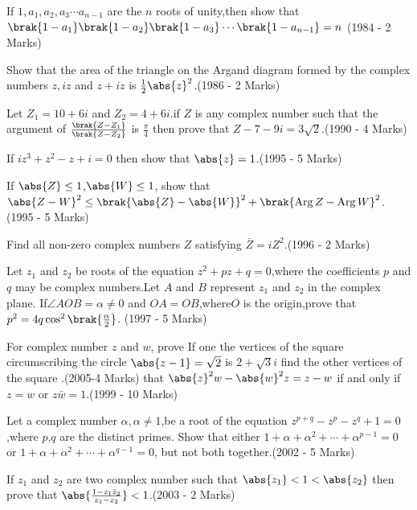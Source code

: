 \iffalse
    \title{Assignment}
    \author{Shreyansh Sonkar - ai24btech11032}
    \section{subjective}
\fi                                     
    \item If $1,a_{1},a_{2},a_{3}\cdots a_{n-1}$ are the $n$ roots of unity,then show that $\brak{1-a_1}\brak{1-a_2}\brak{1-a_3}\cdots \brak{1-a_{n-1}} = n$ \hfill (1984 - 2 Marks)
    \item Show that the area of the triangle on the Argand diagram formed by the complex numbers $z,iz$ and $z+iz$ is $\frac{1}{2}\abs{z}^{2}$.\hfill (1986 - 2 Marks)
    \item Let $Z_{1}=10+6i$ and $Z_{2}=4+6i$.if $Z$ is any complex number such that the argument of $\frac{\brak{Z-Z_1}}{\brak{Z-Z_2}}$ is $\frac{\pi}{4}$ then prove that $Z-7-9i = 3\sqrt{2}$.\hfill(1990 - 4 Marks)
    \item If $iz^{3}+z^{2}-z+i=0$ then show that $\abs{z}=1$.\hfill(1995 - 5 Marks)
    \item If $\abs{Z}\le1$,$\abs{W}\le1$, show that $\abs{Z-W}^{2}\le \brak{\abs{Z}-\abs{W}}^{2}+\brak{\operatorname{Arg}Z-\operatorname{Arg}W}^2$.\hfill(1995 - 5 Marks)
    \item Find all non-zero complex numbers $Z$ satisfying $\bar Z=iZ^{2}$.\hfill(1996 - 2 Marks)
    \item Let $z_{1}$ and $z_{2}$ be roots of the equation $z^{2}+pz+q=0$,where the coefficients $p$ and $q$ may be complex numbers.Let $A$ and $B$ represent $z_{1}$ and $z_{2}$ in the complex plane. If$\angle AOB=\alpha\not=0$ and $OA=OB$,where$O$ is the origin,prove that $p^{2}=4q\cos^{2}\brak{\frac{\alpha}{2}}$. \hfill(1997 - 5 Marks)
    \item For complex number $z$ and $w$, prove If one the vertices of the square circumscribing the circle $\abs{z-1}=\sqrt{2}$ is $2+\sqrt{3}i$ find the other vertices of the square .\hfill (2005-4 Marks) that $\abs{z}^{2}w-\abs{w}^{2}z=z-w$ if and only if $z=w$ or $z\bar{w}=1$.\hfill(1999 - 10 Marks)
    \item Let a complex number $\alpha , \alpha \not = 1$,be a root of the equation $z^{p+q}-z^{p}-z^{q}+1 = 0$,where $p$,$q$ are the distinct primes. Show that either $1+\alpha+\alpha^{2}+\cdots+\alpha^{p-1}=0$ or $1+\alpha+\alpha^{2}+\cdots+\alpha^{q- 1}=0$, but not both together.\hfill(2002 - 5 Marks)
    \item If $z_{1}$ and $z_{2}$ are two complex number such that $\abs{z_{1}}<1<\abs{z_{2}}$ then prove that  $\abs{\frac{1-z_{1} \bar z_{2}}{z_{1}-z_{2}}}<1$.\hfill(2003 - 2 Marks)
